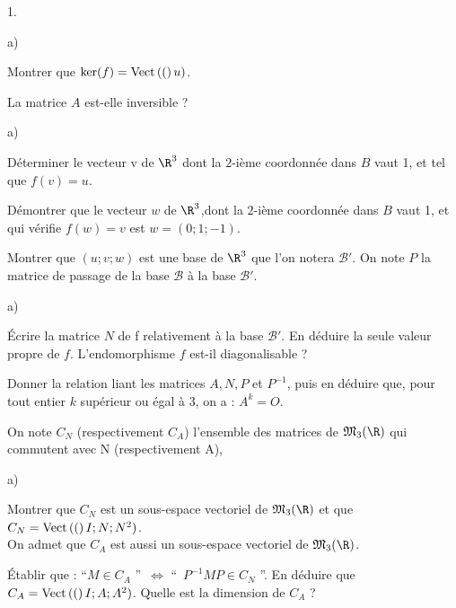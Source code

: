 \documentclass[11pt]{article}%
\begin{document}
\begin{noliste}{1.}
 \setlength{\itemsep}{4mm}
\item 

\begin{noliste}{a)}
 \setlength{\itemsep}{2mm}
\item Montrer que $\ker (f) = {\rm{Vect}}\left((\right)u)$.

\item La matrice $A$ est-elle inversible ?
\end{noliste}

\item 

\begin{noliste}{a)}
 \setlength{\itemsep}{2mm}
\item Déterminer le vecteur v de $\R^{3}$ dont la $2$-ième coordonnée
dans $B$ vaut 1, et tel que $f(v) = u.$

\item Démontrer que le vecteur $w$ de $\R^{3}$,dont la $2$-ième
coordonnée dans $B$ vaut 1, et qui vérifie $f(w) = v$ est $w =
(0;1;-1)$.

\item Montrer que $(u;v;w)$ est une base de $\R^{3}$ que l'on notera 
$\mathcal{B}{\prime }$. On note $P$ la matrice de passage de la base
$\mathcal{B}$ à la base $\mathcal{B}{\prime }$.
\end{noliste}

\item 

\begin{noliste}{a)}
 \setlength{\itemsep}{2mm}
\item Écrire la matrice $N$ de f relativement à la base
$\mathcal{B}{\prime
}$. En déduire la seule valeur propre de $f$. L'endomorphisme $f$
est-il
diagonalisable ?

\item Donner la relation liant les matrices $A,N,P$ et $P^{-1}$, puis
en déduire que, pour tout entier $k$ supérieur ou égal à 3, on a :
$A^{k} = O$.
\end{noliste}

\item On note $C_{N}$ (respectivement $C_{A}$) l'ensemble des matrices
de $
\mathfrak{M}_{3}(\R)$ qui commutent avec N (respectivement A),

\begin{noliste}{a)}
 \setlength{\itemsep}{2mm}
\item Montrer que $C_{N}$ est un sous-espace vectoriel de
$\mathfrak{M}_{3}(
\R)$ et que $C_{N} = {\rm{Vect}}\left((\right)I;N;N^{2})$.\\
On admet que $C_{A}$ est aussi un sous-espace vectoriel de
$\mathfrak{M}_{3}(
\R)$.

\item Établir que : \textquotedblleft $M\in C_{A}$ \textquotedblright\
$
\Leftrightarrow $ \textquotedblleft\ $P^{-1}MP\in C_{N}$
\textquotedblright. En déduire que $C_{A} = {\rm{Vect}}\left((\right)I;A;A^{2})$. Quelle
est la dimension de $C_{A}$ ?
\end{noliste}
\end{noliste}
\end{document}
